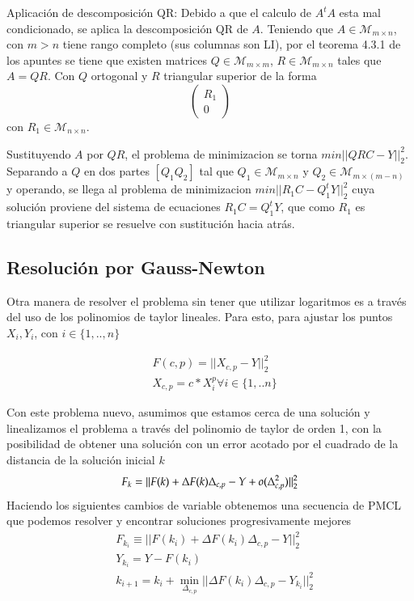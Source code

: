 \documentclass{endm}
\begin{document}
Aplicación de descomposición QR:
Debido a que el calculo de $A^tA$ esta mal condicionado, se aplica la descomposición QR de $A$.
Teniendo que $A \in \mathcal{M}_{m \times n}$, con $m > n$ tiene rango completo (sus columnas son LI),
por el teorema 4.3.1 de los apuntes se tiene que existen matrices $Q \in \mathcal{M}_{m \times m}$,
$R \in \mathcal{M}_{m \times n}$ tales que $A = QR$. Con $Q$ ortogonal
y $R$ triangular superior de la forma  \begin{equation*} \begin{pmatrix} R_1 \\ 0 \end{pmatrix}\end{equation*} con $R_1 \in \mathcal{M}_{n \times n}$.

Sustituyendo $A$ por $QR$, el problema de minimizacion se torna $min ||QRC - Y||^2_2$.
Separando a $Q$ en dos partes $[Q_1 Q_2]$ tal que $Q_1 \in \mathcal{M}_{m \times n}$ y
$Q_2 \in \mathcal{M}_{m \times (m-n)}$ y operando, se llega al problema de minimizacion $min ||R_1C - Q_1^tY||^2_2$
cuya solución proviene del sistema de ecuaciones $R_1C = Q_1^tY$, que como $R_1$ es triangular superior se resuelve con
sustitución hacia atrás.




\subsection{Resolución por Gauss-Newton}
Otra manera de resolver el problema sin tener que utilizar logaritmos es a través del uso de los polinomios de taylor lineales. Para esto, para ajustar los puntos $X_i,Y_i$, con $ i \in \{1,..,n\}$

\begin{align*}
&F(c,p) =||X_{c,p} - Y||^2_2 \\
&X_{c,p} = c*X_i^p \forall i \in \{1,..n\}
\end{align*}

Con este problema nuevo, asumimos que estamos cerca de una solución y linealizamos el problema a través del polinomio de taylor de orden 1, con la posibilidad de obtener una solución con un error acotado por el cuadrado de la distancia de la solución inicial $k$
\begin{equation*}
F_k = ||  F(k) + \Delta F(k)\Delta_{c,p} - Y + o(\Delta_{c,p}^2)||^2_2\\
\end{equation*}
Haciendo los siguientes cambios de variable obtenemos una secuencia de PMCL que podemos resolver y encontrar soluciones progresivamente mejores
\begin{align*}
&F_{k_i} \equiv || F(k_i) + \Delta F(k_i)\Delta_{c,p} - Y||^2_2\\
&Y_{k_i} = Y - F(k_i) \\
&k_{i+1} = k_i + \min_{\Delta_{c,p}} || \Delta F(k_i)\Delta_{c,p} - Y_{k_i} ||^2_2
\end{align*}
\end{document}

